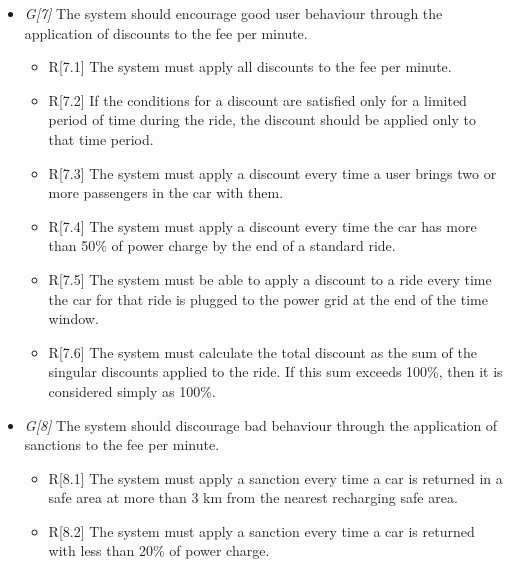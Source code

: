 \begin{itemize}
				\item \textit{G[7]} The system should encourage good user behaviour through the application of discounts to the fee per minute. 
					\begin{itemize}
						\item R[7.1] The system must apply all discounts to the fee per minute.
						\item R[7.2] If the conditions for a discount are satisfied only for a limited period of time during the ride, the discount should be applied only to that time period. %
						\item R[7.3] The system must apply a discount every time a user brings two or more passengers in the car with them.
						\item R[7.4] The system must apply a discount every time the car has more than 50\% of power charge by the end of a standard ride. %
						\item R[7.5] The system must be able to apply a discount to a ride every time the car for that ride is plugged to the power grid at the end of the time window. 
						\item R[7.6] The system must calculate the total discount as the sum of the singular discounts applied to the ride. If this sum exceeds 100\%, then it is considered simply as 100\%.
					\end{itemize}
					
				\item \textit{G[8]} The system should discourage bad behaviour through the application of sanctions to the fee per minute.
					\begin{itemize}
						\item R[8.1] The system must apply a sanction every time a car is returned in a safe area at more than 3 km from the nearest recharging safe area.
						\item R[8.2] The system must apply a sanction every time a car is returned with less than 20\% of power charge.
					\end{itemize}
					

\end{itemize}
